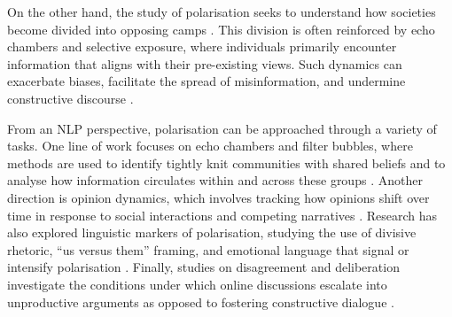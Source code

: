 

On the other hand, the study of polarisation seeks to understand how societies become divided into opposing camps \cite{del2016echo}. This division is often reinforced by echo chambers and selective exposure, where individuals primarily encounter information that aligns with their pre-existing views. Such dynamics can exacerbate biases, facilitate the spread of misinformation, and undermine constructive discourse \cite{wang-etal-2025-decoding}.

From an \ac{NLP} perspective, polarisation can be approached through a variety of tasks. One line of work focuses on echo chambers and filter bubbles, where methods are used to identify tightly knit communities with shared beliefs and to analyse how information circulates within and across these groups \cite{minici2022cascade}. Another direction is opinion dynamics, which involves tracking how opinions shift over time in response to social interactions and competing narratives \cite{willaert2020building}. Research has also explored linguistic markers of polarisation, studying the use of divisive rhetoric, ``us versus them” framing, and emotional language that signal or intensify polarisation \cite{herdiansah2018religious}. Finally, studies on disagreement and deliberation investigate the conditions under which online discussions escalate into unproductive arguments as opposed to fostering constructive dialogue \cite{stromer2009agreement}.

